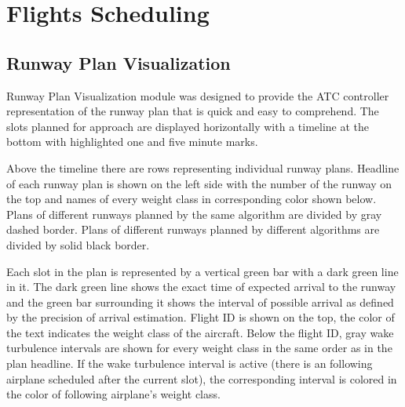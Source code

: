 
\chapter{Flights Scheduling}




\section{Runway Plan Visualization}

Runway Plan Visualization module was designed to provide the ATC controller representation of the runway plan that is quick and easy to comprehend. The slots planned for approach are displayed horizontally with a timeline at the bottom with highlighted one and five minute marks.

Above the timeline there are rows representing individual runway plans. Headline of each runway plan is shown on the left side with the number of the runway on the top and names of every weight class in corresponding color shown below. Plans of different runways planned by the same algorithm are divided by gray dashed border. Plans of different runways planned by different algorithms are divided by solid black border.

Each slot in the plan is represented by a vertical green bar with a dark green line in it. The dark green line shows the exact time of expected arrival to the runway and the green bar surrounding it shows the interval of possible arrival as defined by the precision of arrival estimation. Flight ID is shown on the top, the color of the text indicates the weight class of the aircraft. Below the flight ID, gray wake turbulence intervals are shown for every weight class in the same order as in the plan headline. If the wake turbulence interval is active (there is an following airplane scheduled after the current slot), the corresponding interval is colored in the color of following airplane's weight class.


